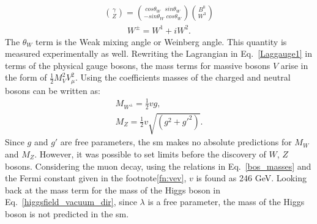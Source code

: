 \begin{eqnarray}
\label{Zbos}
	{ \gamma \choose Z } = { cos \theta_W \, \,\, \, sin \theta_W \choose -sin \theta_W \,\, cos \theta_W  } { B^0 \choose W^3 }
\end{eqnarray}
\begin{eqnarray}
\label{Wbos}
	{W^{\pm}}= {W^1+iW^2} .
\end{eqnarray}
The $\theta_W $ term is the Weak mixing angle or Weinberg angle. This quantity is measured experimentally as well.
Rewriting the Lagrangian in Eq.~\ref{Laggauge1} in terms of the physical gauge bosons, the mass terms for massive bosons $V$ arise in the form of $\frac{1}{2}M^2_VV^2_{\mu}$. Using the coefficients masses of the charged and neutral bosons can be written as:
\begin{eqnarray}
\label{bos_masses}
	{M_{W^{\pm}}}= {\frac{1}{2}vg} ,\nonumber\\
	{M_Z}={\frac{1}{2}v\sqrt{(g^2+g'^2)}}.
\end{eqnarray}
Since $g$ and $g′$ are free parameters, the \acrshort{sm} makes no absolute predictions for $M_W$ and $M_Z$. However, it was possible to set limits before the discovery of $W$, $Z$ bosons.
Considering the muon decay, using the relations in Eq.~\ref{bos_masses} and the Fermi constant given in the footnote\ref{fn:vev}, $v$ is found as 246 GeV.
Looking back at the mass term for the mass of the Higgs boson in Eq.~\ref{higgsfield_vacuum_dir}, since $\lambda$ is a free parameter, the mass of the Higgs boson is not predicted in the \acrshort{sm}.\\

